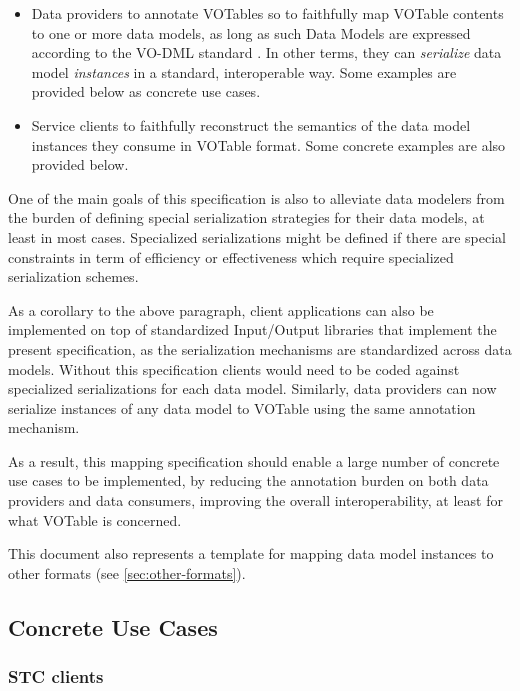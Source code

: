 \documentclass[11pt,a4paper]{ivoa}
\begin{document}
\begin{itemize}
\itemsep1pt\parskip0pt
\item
  Data providers to annotate VOTables so to faithfully map VOTable
  contents to one or more data models, as long as such Data Models are
  expressed according to the VO-DML standard \citet{2018ivoa.spec.0910L}. In other
  terms, they can \emph{serialize} data model \emph{instances} in a
  standard, interoperable way. Some examples are provided below as
  concrete use cases.
\item
  Service clients to faithfully reconstruct the semantics of the data
  model instances they consume in VOTable format. Some concrete examples
  are also provided below.
\end{itemize}

One of the main goals of this specification is also to alleviate data
modelers from the burden of defining special serialization strategies
for their data models, at least in most cases. Specialized
serializations might be defined if there are special constraints in term
of efficiency or effectiveness which require specialized serialization
schemes.

As a corollary to the above paragraph, client applications can also be
implemented on top of standardized Input/Output libraries that implement
the present specification, as the serialization mechanisms are
standardized across data models. Without this specification clients
would need to be coded against specialized serializations for each data
model. Similarly, data providers can now serialize instances of any data
model to VOTable using the same annotation mechanism.

As a result, this mapping specification should enable a large number of
concrete use cases to be implemented, by reducing the annotation burden
on both data providers and data consumers, improving the overall
interoperability, at least for what VOTable is concerned.

This document also represents a template for mapping data model
instances to other formats (see \ref{sec:other-formats}).

\subsection{Concrete Use Cases}\label{concrete-use-cases}

\subsubsection{STC clients}\label{stc-clients}
\end{document}
